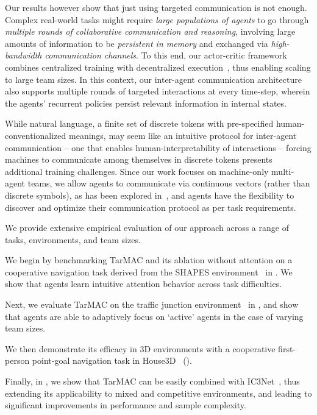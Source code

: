 Our results however show that just using targeted communication is not enough.
Complex real-world tasks might require \emph{large populations of agents} to go through
\emph{multiple rounds of collaborative communication and reasoning}, involving
large amounts of information to be \emph{persistent in memory} and exchanged via
\emph{high-bandwidth communication channels}. To this end, our actor-critic
framework combines centralized training with decentralized execution~\citep{lowe_nips17},
thus enabling scaling to large team sizes. In this context, our inter-agent
communication architecture also supports multiple rounds of targeted interactions at
every time-step, wherein the agents' recurrent policies persist
relevant information in internal states.

While natural language, \ie a finite set of discrete tokens with pre-specified human-conventionalized meanings, may seem like an intuitive protocol for inter-agent communication -- one that enables human-interpretability of interactions -- forcing machines to communicate among themselves in discrete tokens presents additional training challenges. Since our work focuses on machine-only multi-agent teams, we allow agents to communicate via continuous vectors (rather than discrete symbols),
as has been explored in~\cite{sukhbaatar_nips16,singh_iclr19},
and agents have the flexibility to discover and optimize their communication protocol as per task requirements.

We provide extensive empirical evaluation of our approach across
a range of tasks, environments, and team sizes.
\begin{compactitem}
\item We begin by benchmarking TarMAC and its ablation without attention on a
    cooperative navigation task derived from the SHAPES environment~\citep{andreas_cvpr16} in .
    We show that agents learn intuitive attention behavior across task difficulties.
\item Next, we evaluate TarMAC on the traffic junction environment~\citep{sukhbaatar_nips16} in ,
    and show that agents are able to adaptively focus on `active' agents in the
    case of varying team sizes.
\item We then demonstrate its efficacy in $3$D environments with a cooperative first-person point-goal navigation task in House$3$D~\citep{house3d} ().
\item Finally, in , we show that TarMAC can be easily combined with IC3Net~\cite{singh_iclr19},
    thus extending its applicability to mixed and competitive environments, and
    leading to significant improvements in performance and sample complexity.
\end{compactitem}
